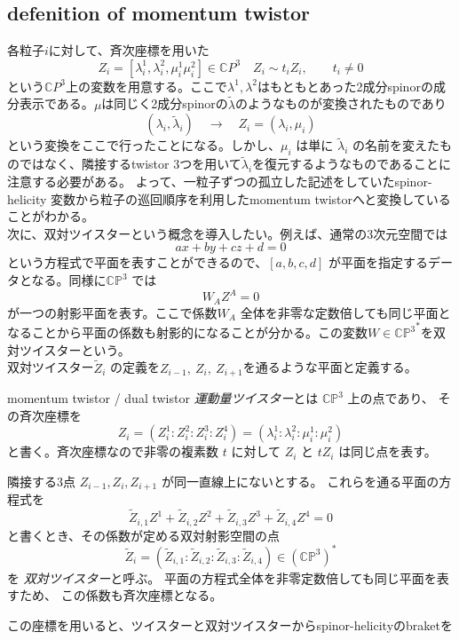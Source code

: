\documentclass[uplatex,dvipdfmx,a4paper,11pt]{jsarticle}
\numberwithin{equation}{section}
\begin{document}
\subsection{defenition of momentum twistor}
各粒子$i$に対して、斉次座標を用いた
\[
Z_i=[
\lambda_i^1
,\lambda_i^2
,\mu_i^1
\mu_i^2] \in \mathbb{C}P^3 \quad Z_i\sim t_iZ_i,
\qquad t_i\neq0
\]
という$\mathbb{C}P^3$上の変数を用意する。ここで$\lambda^1,\lambda^2$はもともとあった2成分spinorの成分表示である。$\mu$は同じく2成分spinorの$\tilde{\lambda}$のようなものが変換されたものであり
\[
(\lambda_i,\tilde\lambda_i)
\quad\longrightarrow\quad
Z_i=(\lambda_i,\mu_i)
\]
という変換をここで行ったことになる。しかし、\(\mu_i\) は単に \(\tilde\lambda_i\) の名前を変えたものではなく、隣接するtwistor 3つを用いて\(\tilde\lambda_i\)を復元するようなものであることに注意する必要がある。
よって、一粒子ずつの孤立した記述をしていたspinor-helicity 変数から粒子の巡回順序を利用したmomentum twistorへと変換していることがわかる。\\
次に、双対ツイスターという概念を導入したい。例えば、通常の3次元空間では
\[
ax+by+cz+d=0
\]
という方程式で平面を表すことができるので、$[a,b,c,d]$ が平面を指定するデータとなる。同様に\(\mathbb{CP}^{3}\) では
\[
W_AZ^A=0
\]
が一つの射影平面を表す。ここで係数\(W_A\) 全体を非零な定数倍しても同じ平面となることから平面の係数も射影的になることが分かる。この変数$W \in {\mathbb{CP}^3}^*$を双対ツイスターという。\\
双対ツイスター$\tilde{Z}_i$ の定義を$Z_{i-1},~Z_i,~Z_{i+1}$を通るような平面と定義する。
\begin{mydef}{momentum twistor / dual twistor}
  \emph{運動量ツイスター}とは $\mathbb{CP}^{3}$ 上の点であり、
  その斉次座標を
  \[
    Z_i
      =(Z_i^1:Z_i^2:Z_i^3:Z_i^4)
      =(\lambda_i^1:\lambda_i^2:\mu_i^1:\mu_i^2)
  \]
  と書く。斉次座標なので非零の複素数 $t$ に対して
  $Z_i$ と $tZ_i$ は同じ点を表す。

  隣接する3点 $Z_{i-1},Z_i,Z_{i+1}$ が同一直線上にないとする。
  これらを通る平面の方程式を
  \[
    \widetilde Z_{i,1}Z^1
    +\widetilde Z_{i,2}Z^2
    +\widetilde Z_{i,3}Z^3
    +\widetilde Z_{i,4}Z^4=0
  \]
  と書くとき、その係数が定める双対射影空間の点
  \[
    \widetilde Z_i
      =(\widetilde Z_{i,1}:
        \widetilde Z_{i,2}:
        \widetilde Z_{i,3}:
        \widetilde Z_{i,4})
      \in(\mathbb{CP}^{3})^*
  \]
  を \emph{双対ツイスター}と呼ぶ。
  平面の方程式全体を非零定数倍しても同じ平面を表すため、
  この係数も斉次座標となる。
\end{mydef}
この座標を用いると、ツイスターと双対ツイスターからspinor-helicityのbraketを
\end{document}
